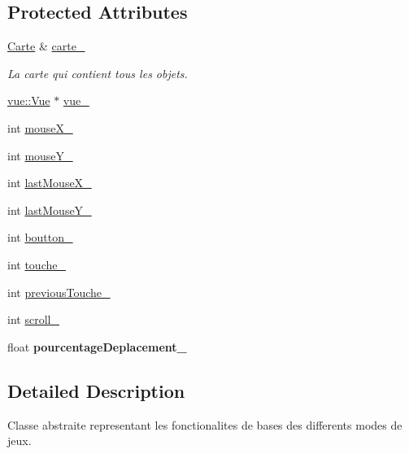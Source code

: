 \subsection*{Protected Attributes}
\begin{DoxyCompactItemize}
\item 
\hypertarget{group__inf2990_ga5349be037dec2b73adb0fbcca724eb2c}{\hyperlink{class_carte}{Carte} \& \hyperlink{group__inf2990_ga5349be037dec2b73adb0fbcca724eb2c}{carte\-\_\-}}\label{group__inf2990_ga5349be037dec2b73adb0fbcca724eb2c}

\begin{DoxyCompactList}\small\item\em La carte qui contient tous les objets. \end{DoxyCompactList}\item 
\hyperlink{classvue_1_1_vue}{vue\-::\-Vue} $\ast$ \hyperlink{group__inf2990_ga5d11ef13ab8e861e9c6c14b722ac85bf}{vue\-\_\-}
\item 
int \hyperlink{group__inf2990_gaebf64b4f7fa00bda679ed2815c3030cc}{mouse\-X\-\_\-}
\item 
int \hyperlink{group__inf2990_ga20f528aad2f2937cf34559ec8091cc22}{mouse\-Y\-\_\-}
\item 
int \hyperlink{group__inf2990_ga5f106517d59dda12c86741443236f981}{last\-Mouse\-X\-\_\-}
\item 
int \hyperlink{group__inf2990_ga24d07ce8ed9d2e9176deaaefd8937dd2}{last\-Mouse\-Y\-\_\-}
\item 
int \hyperlink{group__inf2990_ga6aefbc7c04b8d51ef72b4648f5278ba4}{boutton\-\_\-}
\item 
int \hyperlink{group__inf2990_ga076e503a05fd9f20e5ecc64e91eabf7f}{touche\-\_\-}
\item 
int \hyperlink{group__inf2990_ga231796955c445be70dc2273b6de8da36}{previous\-Touche\-\_\-}
\item 
int \hyperlink{group__inf2990_ga388bde29eb1b80839575085a97dd6063}{scroll\-\_\-}
\item 
\hypertarget{group__inf2990_ga41985d319601cbba0f6da4ed8d6387fb}{float {\bfseries pourcentage\-Deplacement\-\_\-}}\label{group__inf2990_ga41985d319601cbba0f6da4ed8d6387fb}

\end{DoxyCompactItemize}


\subsection{Detailed Description}
Classe abstraite representant les fonctionalites de bases des differents modes de jeux. 

